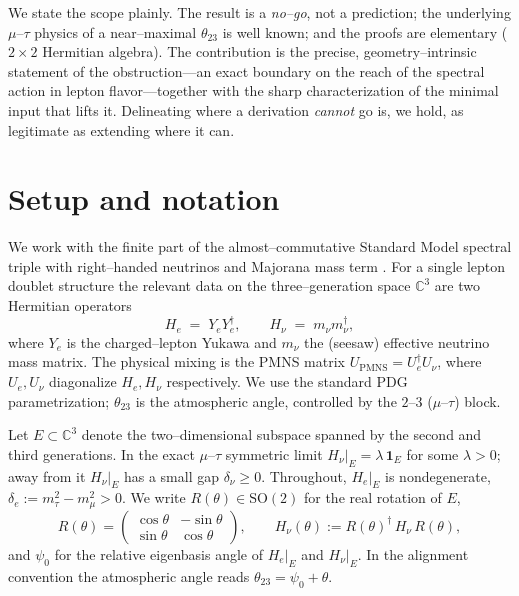 \documentclass[11pt,a4paper]{article}
\theoremstyle{definition}
\newcommand{\He}{H_e}
\newcommand{\Hnu}{H_\nu}
\newcommand{\PMNS}{U_{\mathrm{PMNS}}}
\newcommand{\one}{\mathbf 1}
\begin{document}
We state the scope plainly. The result is a \emph{no--go}, not a prediction; the
underlying $\mu$--$\tau$ physics of a near--maximal $\theta_{23}$ is well known; and
the proofs are elementary ($2\times2$ Hermitian algebra). The contribution is the
precise, geometry--intrinsic statement of the obstruction---an exact boundary on
the reach of the spectral action in lepton flavor---together with the sharp
characterization of the minimal input that lifts it. Delineating where a
derivation \emph{cannot} go is, we hold, as legitimate as extending where it can.

\section{Setup and notation}\label{sec:setup}

We work with the finite part of the almost--commutative Standard Model spectral
triple with right--handed neutrinos and Majorana mass term
\cite{ccm2007,vanSuijlekom2015}. For a single lepton doublet structure the relevant
data on the three--generation space $\mathbb C^3$ are two Hermitian operators
\begin{equation}
  \He \;=\; Y_e Y_e^\dagger, \qquad \Hnu \;=\; m_\nu m_\nu^\dagger,
\end{equation}
where $Y_e$ is the charged--lepton Yukawa and $m_\nu$ the (seesaw) effective
neutrino mass matrix. The physical mixing is the PMNS matrix
$\PMNS = U_e^\dagger U_\nu$, where $U_e,U_\nu$ diagonalize $\He,\Hnu$
respectively. We use the standard PDG parametrization; $\theta_{23}$ is the
atmospheric angle, controlled by the $2$--$3$ ($\mu$--$\tau$) block.

Let $E\subset\mathbb C^3$ denote the two--dimensional subspace spanned by the
second and third generations. In the exact $\mu$--$\tau$ symmetric limit
$\Hnu|_E=\lambda\,\one_E$ for some $\lambda>0$; away from it $\Hnu|_E$ has a small
gap $\delta_\nu\ge 0$. Throughout, $\He|_E$ is nondegenerate,
$\delta_e := m_\tau^2-m_\mu^2>0$. We write $R(\theta)\in\mathrm{SO}(2)$ for the real
rotation of $E$,
\begin{equation}
  R(\theta)=\begin{pmatrix}\cos\theta & -\sin\theta\\ \sin\theta & \cos\theta\end{pmatrix},
  \qquad \Hnu(\theta):=R(\theta)^\dagger\,\Hnu\,R(\theta),
\end{equation}
and $\psi_0$ for the relative eigenbasis angle of $\He|_E$ and $\Hnu|_E$. In the
alignment convention the atmospheric angle reads $\theta_{23}=\psi_0+\theta$.
\end{document}
